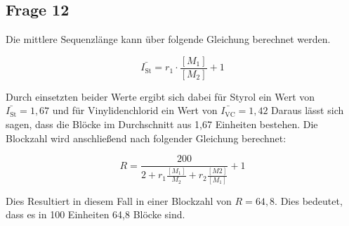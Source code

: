 \documentclass[10pt,a4paper,ngerman]{scrartcl}
\begin{document}
	\subsection{Frage 12}
		
		Die mittlere Sequenzlänge kann über folgende Gleichung berechnet werden.	
			
			\begin{equation}
				\bar{I_\text{St}} = r_1 \cdot \frac{[M_1]}{[M_2]} + 1
			\end{equation}
				
		Durch einsetzten beider Werte ergibt sich dabei für Styrol ein Wert von $\bar{I_\text{St}} = 1,67$ 
		und für Vinylidenchlorid ein Wert von $\bar{I_\text{VC}} = 1,42$
		Daraus lässt sich sagen, dass die Blöcke im Durchschnitt aus 1,67 Einheiten bestehen.
		Die Blockzahl wird anschließend nach folgender Gleichung berechnet:
		
			 \begin{equation}
				R = \frac{200}{2 + r_1 \frac{[M_1]}{M_2} + r_2 \frac{[M2]}{[M_1]}} + 1
			 \end{equation}
		
		Dies Resultiert in diesem Fall in einer Blockzahl von $R = 64,8$. Dies bedeutet, dass es in 100 Einheiten 64,8 Blöcke sind.
\printbibliography
\end{document}
